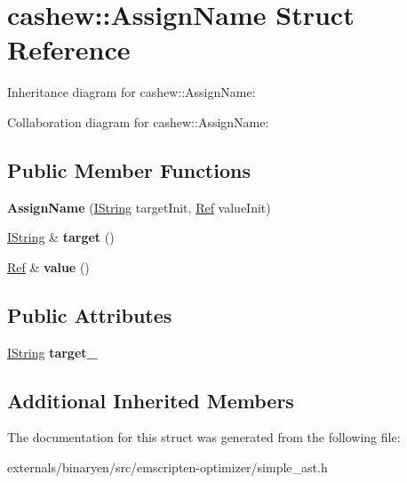 \hypertarget{structcashew_1_1_assign_name}{}\section{cashew\+:\+:Assign\+Name Struct Reference}
\label{structcashew_1_1_assign_name}


Inheritance diagram for cashew\+:\+:Assign\+Name\+:


Collaboration diagram for cashew\+:\+:Assign\+Name\+:
\subsection*{Public Member Functions}
\begin{DoxyCompactItemize}
\item 
\mbox{\label{structcashew_1_1_assign_name_ada0ac3d42fe6962d210cfbf6501508b3}} 
{\bfseries Assign\+Name} (\mbox{\hyperlink{structcashew_1_1_i_string}{I\+String}} target\+Init, \mbox{\hyperlink{structcashew_1_1_ref}{Ref}} value\+Init)
\item 
\mbox{\label{structcashew_1_1_assign_name_a00f8f42adffa0c9a3e9562c09fe7e3b1}} 
\mbox{\hyperlink{structcashew_1_1_i_string}{I\+String}} \& {\bfseries target} ()
\item 
\mbox{\label{structcashew_1_1_assign_name_a392c95e5af64d74213516f2a17f0584f}} 
\mbox{\hyperlink{structcashew_1_1_ref}{Ref}} \& {\bfseries value} ()
\end{DoxyCompactItemize}
\subsection*{Public Attributes}
\begin{DoxyCompactItemize}
\item 
\mbox{\label{structcashew_1_1_assign_name_a009c49d6d3c6b6e71ddd7977802f431f}} 
\mbox{\hyperlink{structcashew_1_1_i_string}{I\+String}} {\bfseries target\+\_\+}
\end{DoxyCompactItemize}
\subsection*{Additional Inherited Members}


The documentation for this struct was generated from the following file\+:\begin{DoxyCompactItemize}
\item 
externals/binaryen/src/emscripten-\/optimizer/simple\+\_\+ast.\+h\end{DoxyCompactItemize}
